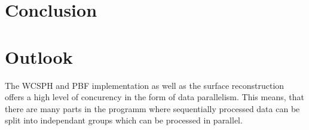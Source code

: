 \documentclass[11pt, letterpaper, twocolumn]{article}
\begin{document}
\section{Conclusion}
\label{sec:conclusion}



\section{Outlook}
\label{sec:future}
The WCSPH and PBF implementation as well as the surface reconstruction offers a high level of concurency in the form of data parallelism. This means, that there are many parts in the programm where sequentially processed data can be split into independant groups which can be processed in parallel.





{\footnotesize
}



\end{document}
